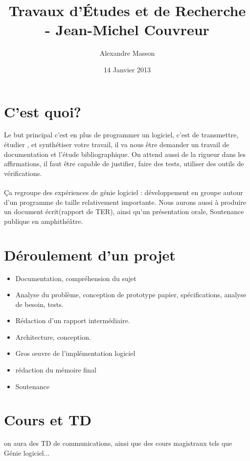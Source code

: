 \documentclass{article}
\title{Travaux d’Études et de Recherche - Jean-Michel Couvreur}
\author{Alexandre Masson}
\date{14 Janvier 2013}
\begin{document}
\maketitle
\newpage
\section{C'est quoi?} Le but principal c'est en plus de programmer un logiciel, c’est de transmettre, étudier , et synthétiser votre travail, il va nous être demander un travail de documentation et l'étude bibliographique. On attend aussi de la rigueur dans les affirmations, il faut être capable de justifier, faire des tests, utiliser des outils de vérifications.\\\\Ça regroupe des expériences de génie logiciel : développement en groupe autour d'un programme de taille relativement importante. Nous aurons aussi à produire un document écrit(rapport de TER), ainsi qu'un présentation orale, Soutenance publique en amphithéâtre.
\section{Déroulement d'un projet}
\begin{itemize}
\item Documentation, compréhension du sujet
\item Analyse du problème, conception de prototype papier, spécifications, analyse de besoin, tests.
\item Rédaction d'un rapport intermédiaire.
\item Architecture, conception.
\item Gros œuvre de l'implémentation logiciel
\item rédaction du mémoire final
\item Soutenance
\end{itemize} 
\section{Cours et TD} on aura des TD de communications, ainsi que des cours magistraux tels que Génie logiciel...\\\\
\end{document}
